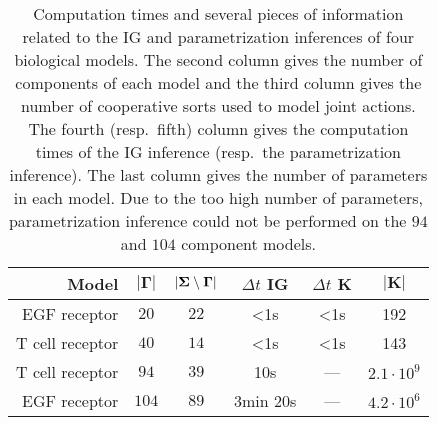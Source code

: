 \begin{table}[ht]
\begin{center}
  \begin{tabular}{r|c|c|c|c|c}
    \textbf{Model} & $\mathbf{|\Gamma|}$ & $\mathbf{|\Sigma \setminus \Gamma|}$ & \textbf{$\Delta t$ IG} & \textbf{$\Delta t$ K} & $\mathbf{|K|}$
\\\hline\hline
    EGF receptor \cite{Sahin09} & $20$ & $22$ & <1s & <1s & 192
\\\hline
    T cell receptor \cite{Klamt06} & $40$ & $14$ & <1s & <1s & 143
\\\hline
    T cell receptor \cite{SaezRodriguez2007} & $94$ & $39$ & 10s & --- & $2.1\cdot10^{9}$
\\\hline
    EGF receptor \cite{Samaga2009} & $104$ & $89$ & 3min 20s & --- & $4.2\cdot10^{6}$
  \end{tabular}
\end{center}
\caption{%
  Computation times and several pieces of information related to the IG and parametrization inferences of four biological models.
  The second column gives the number of components of each model and
  the third column gives the number of cooperative sorts used to model joint actions.
  The fourth (resp.~fifth) column gives the computation times of the IG inference (resp.~the parametrization inference).
  The last column gives the number of parameters in each model.
  Due to the too high number of parameters, parametrization inference could not be performed on the $94$ and $104$ component models.
  }
\label{tb:computation}
\end{table}
